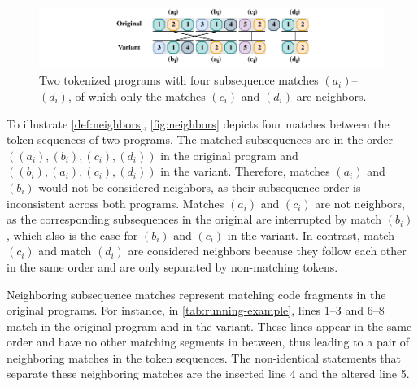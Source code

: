 \begin{figure}[b]
    \centering
    \includegraphics[width=\linewidth]{figures/algorithm/neighbors.pdf}
    \caption[Neighboring Subsequence Matches]{Two tokenized programs with four subsequence matches $(a_i)$--$(d_i)$, of which only the matches $(c_i)$ and $(d_i)$ are neighbors.}
    \label{fig:neighbors}
\end{figure}

To illustrate \autoref{def:neighbors}, \autoref{fig:neighbors} depicts four matches between the token sequences of two programs. The matched subsequences are in the order $((a_i), (b_i), (c_i), (d_i))$ in the original program and $((b_i), (a_i), (c_i), (d_i))$ in the variant. Therefore, matches $(a_i)$ and $(b_i)$ would not be considered neighbors, as their subsequence order is inconsistent across both programs. Matches $(a_i)$ and $(c_i)$ are not neighbors, as the corresponding subsequences in the original are interrupted by match $(b_i)$, which also is the case for $(b_i)$ and $(c_i)$ in the variant. In contrast, match $(c_i)$ and match $(d_i)$ are considered neighbors because they follow each other in the same order and are only separated by non-matching tokens.

Neighboring subsequence matches represent matching code fragments in the original programs. For instance, in \autoref{tab:running-example}, lines 1--3 and 6--8 match in the original program and in the variant. These lines appear in the same order and have no other matching segments in between, thus leading to a pair of neighboring matches in the token sequences. The non-identical statements that separate these neighboring matches are the inserted line 4 and the altered line 5.

